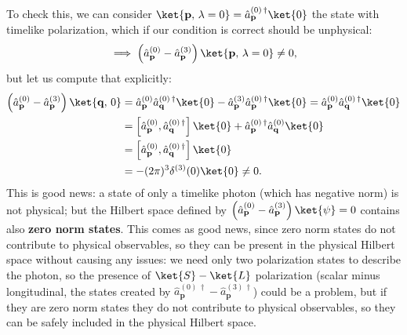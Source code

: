 To check this, we can consider \(\ket{\mathbf{p},\, \lambda=0} = \hat{a}^{(0)\,\dagger}_{\mathbf{p}} \ket{0}\) the state with timelike polarization, which if our condition is correct should be unphysical:
\[
    \implies \left( \hat{a}^{(0)}_{\mathbf{p}} -  \hat{a}^{(3)}_{\mathbf{p}} \right) \ket{\mathbf{p},\, \lambda=0} \neq 0,
\]
but let us compute that explicitly:
\[
    \begin{aligned}
        \left( \hat{a}^{(0)}_{\mathbf{p}} -  \hat{a}^{(3)}_{\mathbf{p}} \right) \ket{\mathbf{q},\, 0} & = \hat{a}^{(0)}_{\mathbf{p}} \hat{a}^{(0)\,\dagger}_{\mathbf{q}} \ket{0} - \hat{a}^{(3)}_{\mathbf{p}} \hat{a}^{(0)\,\dagger}_{\mathbf{p}} \ket{0} = \hat{a}^{(0)}_{\mathbf{p}} \hat{a}^{(0)\,\dagger}_{\mathbf{q}} \ket{0} \\
                                                                                                      & = \left[ \hat{a}^{(0)}_{\mathbf{p}}, \hat{a}^{(0)\,\dagger}_{\mathbf{q}} \right] \ket{0} + \hat{a}^{(0)\,\dagger}_{\mathbf{p}} \hat{a}^{(0)}_{\mathbf{q}} \ket{0}                                                          \\
                                                                                                      & = \left[ \hat{a}^{(0)}_{\mathbf{p}}, \hat{a}^{(0)\,\dagger}_{\mathbf{q}} \right] \ket{0}                                                                                                                                   \\
                                                                                                      & = - (2\pi)^3 \delta^{(3)}(0) \ket{0} \neq 0.
    \end{aligned}
\]
This is good news: a state of only a timelike photon (which has negative norm) is not physical; but the Hilbert space defined by \(\left( \hat{a}^{(0)}_{\mathbf{p}} -  \hat{a}^{(3)}_{\mathbf{p}} \right) \ket{\psi} = 0\) contains also \textbf{zero norm states}. This comes as good news, since zero norm states do not contribute to physical observables, so they can be present in the physical Hilbert space without causing any issues: we need only two polarization states to describe the photon, so the presence of \(\ket{S}-\ket{L}\) polarization (scalar minus longitudinal, the states created by \(\hat{a}^{(0)\,\dagger}_{\mathbf{p}} - \hat{a}^{(3)\,\dagger}_{\mathbf{p}}\)) could be a problem, but if they are zero norm states they do not contribute to physical observables, so they can be safely included in the physical Hilbert space.

